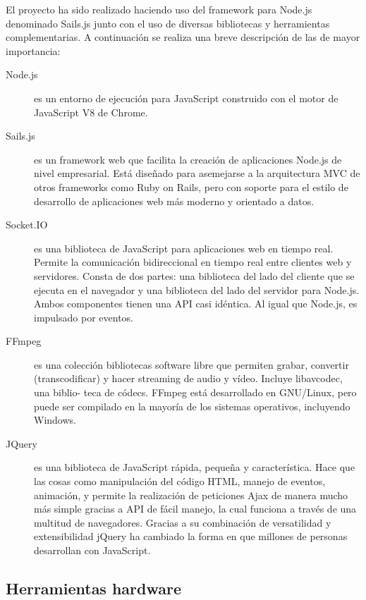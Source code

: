 \documentclass[a4paper,12pt]{article}
\begin{document}
El proyecto ha sido realizado haciendo uso del framework para Node.js denominado Sails.js junto con el uso de diversas bibliotecas y herramientas complementarias. A continuación se realiza una breve descripción de 
las de mayor importancia:\\

\begin{description} 

\item [Node.js] es un entorno de ejecución para JavaScript construido con el motor de JavaScript V8 de Chrome.

\item [Sails.js] es un framework web que facilita la creación de aplicaciones Node.js de nivel empresarial. Está diseñado para asemejarse a la arquitectura MVC de otros frameworks
como Ruby on Rails, pero con soporte para el estilo de desarrollo de aplicaciones web más moderno y orientado a datos.

\item [Socket.IO] es una biblioteca de JavaScript para aplicaciones web en tiempo real. Permite la comunicación bidireccional en tiempo real entre clientes web y servidores. Consta de
dos partes: una biblioteca del lado del cliente que se ejecuta en el navegador y una biblioteca del lado del servidor para Node.js. Ambos componentes tienen una API casi
idéntica. Al igual que Node.js, es impulsado por eventos.

\item [FFmpeg] es una colección bibliotecas software libre que permiten grabar, convertir (transcodificar) y hacer streaming de audio y vídeo. Incluye libavcodec, una biblio-
teca de códecs. FFmpeg está desarrollado en GNU/Linux, pero puede ser compilado en la mayoría de los sistemas operativos, incluyendo Windows.

\item [JQuery] es una biblioteca de JavaScript rápida, pequeña y característica. Hace que las cosas como manipulación del código HTML, manejo de eventos, animación, y permite la realización
de peticiones Ajax de manera mucho más simple gracias a API de fácil manejo, la cual funciona a través de una multitud de navegadores. Gracias a su combinación de versatilidad y extensibilidad 
jQuery ha cambiado la forma en que millones de personas desarrollan con JavaScript.

\end{description}


\subsection{Herramientas hardware}
\end{document}
